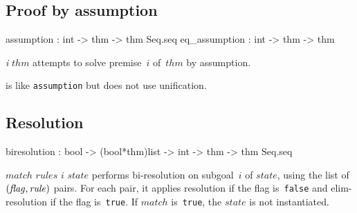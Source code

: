 \subsection{Proof by assumption}
\begin{ttbox} 
assumption    : int -> thm -> thm Seq.seq
eq_assumption : int -> thm -> thm
\end{ttbox}
\begin{ttdescription}
\item[\ttindexbold{assumption} {\it i} $thm$] 
attempts to solve premise~$i$ of~$thm$ by assumption.

\item[\ttindexbold{eq_assumption}] 
is like {\tt assumption} but does not use unification.
\end{ttdescription}


\subsection{Resolution}
\begin{ttbox} 
biresolution : bool -> (bool*thm)list -> int -> thm
               -> thm Seq.seq
\end{ttbox}
\begin{ttdescription}
\item[\ttindexbold{biresolution} $match$ $rules$ $i$ $state$] 
performs bi-resolution on subgoal~$i$ of $state$, using the list of $\it
(flag,rule)$ pairs.  For each pair, it applies resolution if the flag
is~{\tt false} and elim-resolution if the flag is~{\tt true}.  If $match$
is~{\tt true}, the $state$ is not instantiated.
\end{ttdescription}


